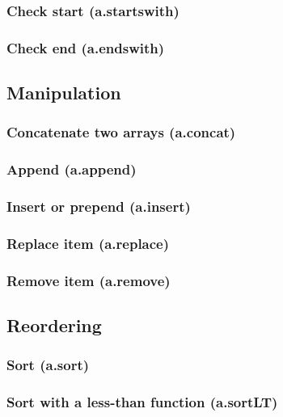\documentclass{article}
\theoremstyle{definition}
\begin{document}
\subsubsection{Check start (a.startswith)}

\subsubsection{Check end (a.endswith)}

\subsection{Manipulation}

\subsubsection{Concatenate two arrays (a.concat)}

\subsubsection{Append (a.append)}

\subsubsection{Insert or prepend (a.insert)}

\subsubsection{Replace item (a.replace)}

\subsubsection{Remove item (a.remove)}

\subsection{Reordering}

\subsubsection{Sort (a.sort)}

\subsubsection{Sort with a less-than function (a.sortLT)}
\end{document}
